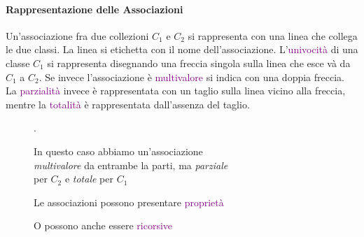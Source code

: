 \newpage
\paragraph{Rappresentazione delle Associazioni} Un'associazione fra due collezioni $C_1$ e $C_2$ si rappresenta
con una linea che collega le due classi. La linea si etichetta con il nome dell'associazione. L'\textcolor{purple}{univocità}
di una classe $C_1$ si rappresenta disegnando una freccia singola sulla linea che esce và da $C_1$ a $C_2$. Se invece l'associazione è
\textcolor{purple}{multivalore} si indica con una doppia freccia.
La \textcolor{purple}{parzialità} invece è rappresentata con un taglio sulla linea vicino alla freccia, mentre la
\textcolor{purple}{totalità} è rappresentata dall'assenza del taglio.

\begin{figure}[h]
    \centering
    \caption{In questo caso abbiamo un'associazione \\ \emph{multivalore} da entrambe la parti, ma \emph{parziale} \\ per $C_2$ e \emph{totale} per $C_1$}.
\end{figure}

\begin{figure}[h]
    \centering
    \caption{Le associazioni possono presentare \textcolor{purple}{proprietà}}
\end{figure}

\begin{figure}[h]
    \centering
    \caption{O possono anche essere \textcolor{purple}{ricorsive}}
\end{figure}